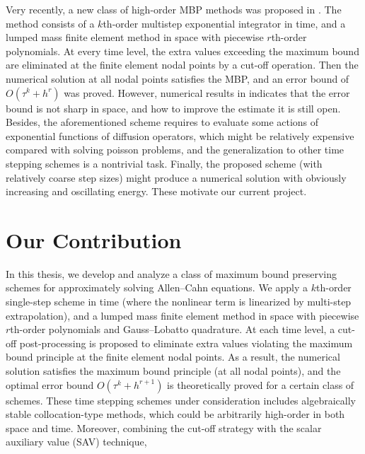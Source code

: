 Very recently, a new class of high-order MBP methods was proposed in \cite{LiYangZhou:sisc}.
The method consists of a $k$th-order multistep exponential integrator
in time, and a lumped mass finite element method in space with piecewise $r$th-order
polynomials. At every time level, the extra values exceeding the maximum bound
are eliminated at the finite element nodal points by a cut-off operation.
Then the numerical solution at all nodal points
satisfies the MBP, and an error bound of $O(\tau^k + h^r)$ was proved. However, numerical results in \cite[Table 4.1]{LiYangZhou:sisc}
indicates that the error bound is not sharp in space, and how to improve the estimate it is still open.
Besides, the aforementioned scheme requires to evaluate some actions of exponential functions of diffusion operators,
which might be relatively expensive compared with solving poisson problems, and the generalization to other time stepping schemes is a nontrivial task.
Finally, the proposed scheme (with relatively coarse step sizes) might produce a numerical solution with obviously
increasing and oscillating energy. These motivate our current project.


\section{Our Contribution}

In this thesis, we develop and analyze a class of maximum bound preserving schemes for approximately solving Allen--Cahn equations.
We apply a $k$th-order single-step scheme in time (where the nonlinear term is linearized by multi-step extrapolation),
and  a lumped mass finite element method in space with piecewise
$r$th-order polynomials and Gauss--Lobatto quadrature. At each time level, a cut-off post-processing
is proposed to eliminate extra values violating the maximum bound principle at the finite element nodal points.
As a result, the numerical solution satisfies the maximum bound principle (at all nodal points),
and the optimal error bound $O(\tau^k+h^{r+1})$ is theoretically proved for a certain class of schemes.
These time stepping schemes under consideration includes algebraically stable collocation-type methods,
which could be arbitrarily high-order in both space and time.
Moreover, combining the cut-off strategy with the scalar auxiliary value (SAV) technique,

